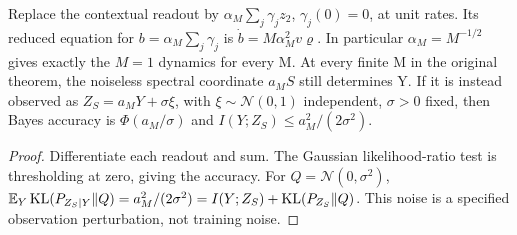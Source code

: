 \begin{proposition}
\label{prop:astra_serial_control}
Replace the contextual readout by $\alpha_M\sum_j\gamma_jz_2$,
$\gamma_j(0)=0$, at unit rates. Its reduced equation for
$b=\alpha_M\sum_j\gamma_j$ is $\dot b=M\alpha_M^2v\varrho$.
In particular $\alpha_M=M^{-1/2}$ gives exactly the $M=1$ dynamics
for every M. At every finite M in the original theorem, the noiseless
spectral coordinate $a_MS$ still determines Y. If it is instead
observed as $Z_S=a_MY+\sigma\xi$, with $\xi\sim\mathcal N(0,1)$
independent, $\sigma>0$ fixed, then Bayes accuracy is
$\Phi(a_M/\sigma)$ and $I(Y;Z_S)\le a_M^2/(2\sigma^2)$.
\end{proposition}
\begin{proof}
Differentiate each readout and sum. The Gaussian likelihood-ratio test
is thresholding at zero, giving the accuracy. For
$Q=\mathcal N(0,\sigma^2)$,
$\mathbb{E}_Y\operatorname{KL}(P_{Z_S|Y}\|Q)=a_M^2/(2\sigma^2)
=I(Y;Z_S)+\operatorname{KL}(P_{Z_S}\|Q)$.
This noise is a specified observation perturbation, not training noise.
\end{proof}

